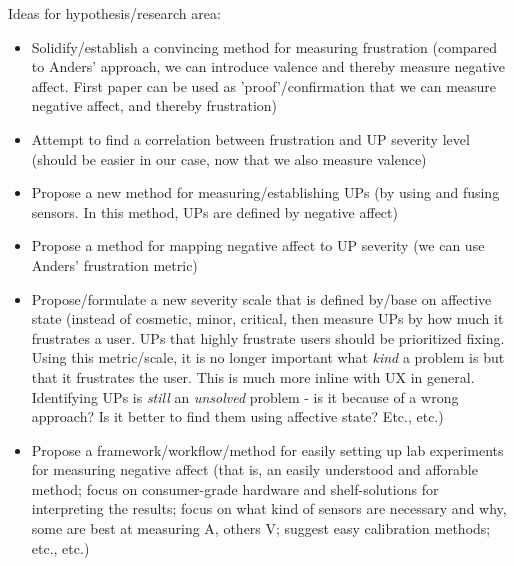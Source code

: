 Ideas for hypothesis/research area:
\begin{itemize}
    \item Solidify/establish a convincing method for measuring frustration (compared to Anders' approach, we can introduce valence and thereby measure negative affect. First paper can be used as 'proof'/confirmation that we can measure negative affect, and thereby frustration)
    \item Attempt to find a correlation between frustration and UP severity level (should be easier in our case, now that we also measure valence)
    \item Propose a new method for measuring/establishing UPs (by using and fusing sensors. In this method, UPs are defined by negative affect)
    \item Propose a method for mapping negative affect to UP severity (we can use Anders' frustration metric)
    \item Propose/formulate a new severity scale that is defined by/base on affective state (instead of cosmetic, minor, critical, then measure UPs by how much it frustrates a user. UPs that highly frustrate users should be prioritized fixing. Using this metric/scale, it is no longer important what \textit{kind} a problem is but that it frustrates the user. This is much more inline with UX in general. Identifying UPs is \textit{still} an \textit{unsolved} problem - is it because of a wrong approach? Is it better to find them using affective state? Etc., etc.)
    \item Propose a framework/workflow/method for easily setting up lab experiments for measuring negative affect (that is, an easily understood and afforable method; focus on consumer-grade hardware and shelf-solutions for interpreting the results; focus on what kind of sensors are necessary and why, some are best at measuring A, others V; suggest easy calibration methods; etc., etc.)
\end{itemize}
